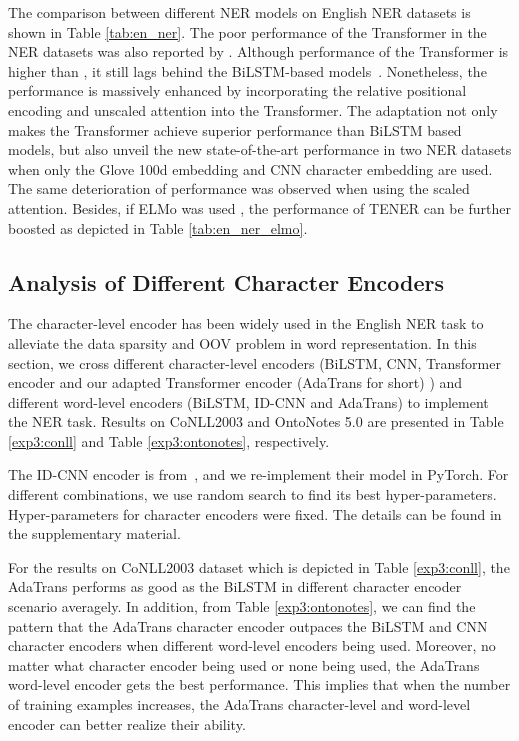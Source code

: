\documentclass[11pt,a4paper]{article}
\begin{document}
The comparison between different NER models on English NER datasets is shown in Table \ref{tab:en_ner}. The poor performance of the Transformer in the NER datasets was also reported by \cite{DBLP:conf/naacl/GuoQLSXZ19}. Although performance of the Transformer is higher than \cite{DBLP:conf/naacl/GuoQLSXZ19}, it still lags behind the BiLSTM-based models~\cite{ma2016end}. Nonetheless, the performance is massively enhanced by incorporating the relative positional encoding and unscaled attention into the Transformer. The adaptation not only makes the Transformer achieve superior performance than BiLSTM based models, but also unveil the new state-of-the-art performance in two NER datasets when only the Glove 100d embedding and CNN character embedding are used. The same deterioration of performance was observed when using the scaled attention. Besides, if ELMo was used \cite{peters2018deep}, the performance of TENER can be further boosted as depicted in Table \ref{tab:en_ner_elmo}.




\subsection{Analysis of Different Character Encoders}

The character-level encoder has been widely used in the English NER task to alleviate the data sparsity and OOV problem in word representation. In this section, we cross different character-level encoders (BiLSTM, CNN, Transformer encoder and our adapted Transformer encoder (AdaTrans for short) ) and different word-level encoders (BiLSTM, ID-CNN and AdaTrans) to implement the NER task. Results on CoNLL2003 and OntoNotes 5.0 are presented in Table \ref{exp3:conll} and Table \ref{exp3:ontonotes}, respectively.

The ID-CNN encoder is from~\cite{strubell2017fast}, and we re-implement their model in PyTorch. For different combinations, we use random search to find its best hyper-parameters. Hyper-parameters for character encoders were fixed. The details can be found in the supplementary material.

For the results on CoNLL2003 dataset which is depicted in Table \ref{exp3:conll}, the AdaTrans performs as good as the BiLSTM in different character encoder scenario averagely. In addition, from Table \ref{exp3:ontonotes}, we can find the pattern that the AdaTrans character encoder outpaces the BiLSTM and CNN character encoders when different word-level encoders being used. Moreover, no matter what character encoder being used or none being used, the AdaTrans word-level encoder gets the best performance. This implies that when the number of training examples increases, the AdaTrans character-level and word-level encoder can better realize their ability.
\end{document}
